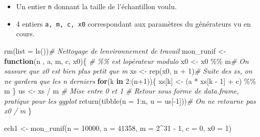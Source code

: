 \documentclass[
]{article}
\newenvironment{Shaded}{\begin{snugshade}}{\end{snugshade}}
\newcommand{\AttributeTok}[1]{\textcolor[rgb]{0.77,0.63,0.00}{#1}}
\newcommand{\CommentTok}[1]{\textcolor[rgb]{0.56,0.35,0.01}{\textit{#1}}}
\newcommand{\ControlFlowTok}[1]{\textcolor[rgb]{0.13,0.29,0.53}{\textbf{#1}}}
\newcommand{\DecValTok}[1]{\textcolor[rgb]{0.00,0.00,0.81}{#1}}
\newcommand{\FunctionTok}[1]{\textcolor[rgb]{0.00,0.00,0.00}{#1}}
\newcommand{\NormalTok}[1]{#1}
\newcommand{\OtherTok}[1]{\textcolor[rgb]{0.56,0.35,0.01}{#1}}
\newcommand{\SpecialCharTok}[1]{\textcolor[rgb]{0.00,0.00,0.00}{#1}}
\providecommand{\tightlist}{%
  \setlength{\itemsep}{0pt}\setlength{\parskip}{0pt}}
\begin{document}
\begin{itemize}
\tightlist
\item
  Un entier \texttt{n} donnant la taille de l'échantillon voulu.
\item
  4 entiers \texttt{a,\ m,\ c,\ x0} correspondant aux paramètres du
  générateurs vu en cours.
\end{itemize}

\begin{Shaded}
\begin{Highlighting}[]
\FunctionTok{rm}\NormalTok{(}\AttributeTok{list =} \FunctionTok{ls}\NormalTok{())}\CommentTok{\# Nettoyage de l\textquotesingle{}environnement de travail}
\NormalTok{mon\_runif }\OtherTok{\textless{}{-}} \ControlFlowTok{function}\NormalTok{(n , a, m, c, x0)\{}
  \CommentTok{\# \%\% est l\textquotesingle{}opérateur modulo}
\NormalTok{  x0 }\OtherTok{\textless{}{-}}\NormalTok{ x0 }\SpecialCharTok{\%\%}\NormalTok{ m}\CommentTok{\# On s\textquotesingle{}assure que x0 est bien plus petit que m}
\NormalTok{  xs }\OtherTok{\textless{}{-}} \FunctionTok{rep}\NormalTok{(x0, n }\SpecialCharTok{+} \DecValTok{1}\NormalTok{)}\CommentTok{\# Suite des xs, on ne gardera que les n derniers}
  \ControlFlowTok{for}\NormalTok{(k }\ControlFlowTok{in} \DecValTok{2}\SpecialCharTok{:}\NormalTok{(n}\SpecialCharTok{+}\DecValTok{1}\NormalTok{))\{}
\NormalTok{    xs[k] }\OtherTok{\textless{}{-}}\NormalTok{ (a }\SpecialCharTok{*}\NormalTok{ xs[k }\SpecialCharTok{{-}} \DecValTok{1}\NormalTok{] }\SpecialCharTok{+}\NormalTok{ c) }\SpecialCharTok{\%\%}\NormalTok{ m}
\NormalTok{  \}}
\NormalTok{  us }\OtherTok{\textless{}{-}}\NormalTok{ xs }\SpecialCharTok{/}\NormalTok{ m }\CommentTok{\# Mise entre 0 et 1}
  \CommentTok{\# Retour sous forme de data.frame, pratique pour les ggplot}
  \FunctionTok{return}\NormalTok{(}\FunctionTok{tibble}\NormalTok{(}\AttributeTok{n =} \DecValTok{1}\SpecialCharTok{:}\NormalTok{n, }\AttributeTok{u =}\NormalTok{ us[}\SpecialCharTok{{-}}\DecValTok{1}\NormalTok{]))}\CommentTok{\# On ne retourne pas x0 / m}
\NormalTok{\}}
\end{Highlighting}
\end{Shaded}

\begin{Shaded}
\begin{Highlighting}[]
\NormalTok{ech1 }\OtherTok{\textless{}{-}} \FunctionTok{mon\_runif}\NormalTok{(}\AttributeTok{n =} \DecValTok{10000}\NormalTok{, }\AttributeTok{a =} \DecValTok{41358}\NormalTok{, }\AttributeTok{m =}  \DecValTok{2}\SpecialCharTok{\^{}}\DecValTok{31} \SpecialCharTok{{-}} \DecValTok{1}\NormalTok{,}
                   \AttributeTok{c =} \DecValTok{0}\NormalTok{, }\AttributeTok{x0 =} \DecValTok{1}\NormalTok{)}
\end{Highlighting}
\end{Shaded}
\end{document}

